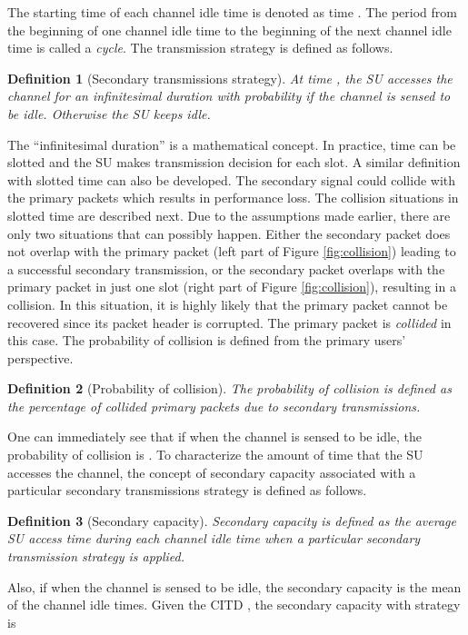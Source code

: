 \documentclass[10pt,final,journal,letterpaper]{IEEEtran}
\newtheorem{definition}{Definition}
\begin{document}
\par
The starting time of each channel idle time is denoted as time . The period from the beginning of one channel idle time to the beginning of the next channel idle time is called a \emph{cycle}. The transmission strategy is defined as follows.
\begin{definition}[Secondary transmissions strategy]
At time , the SU accesses the channel for an infinitesimal duration with probability  if the channel is sensed to be idle. Otherwise the SU keeps idle.
\end{definition}
The ``infinitesimal duration'' is a mathematical concept. In practice, time can be slotted and the SU makes transmission decision for each slot. A similar definition with slotted time can also be developed. The secondary signal could collide with the primary packets which results in performance loss. The collision situations in slotted time are described next. Due to the assumptions made earlier, there are only two situations that can possibly happen. Either the secondary packet does not overlap with the primary packet (left part of Figure \ref{fig:collision}) leading to a successful secondary transmission, or the secondary packet overlaps with the primary packet in just one slot (right part of Figure \ref{fig:collision}), resulting in a collision. In this situation, it is highly likely that the primary packet cannot be recovered since its packet header is corrupted. The primary packet is \emph{collided} in this case. The probability of collision is defined from the primary users' perspective.
\begin{definition}[Probability of collision]
The probability of collision is defined as the percentage of \emph{collided} primary packets due to secondary transmissions.
\end{definition}
One can immediately see that if   when the channel is sensed to be idle, the probability of collision is . To characterize the amount of time that the SU accesses the channel, the concept of secondary capacity associated with a particular secondary transmissions strategy is defined as follows.
\begin{definition}[Secondary capacity]
Secondary capacity is defined as the average SU access time during each channel idle time when a particular secondary transmission strategy is applied.
\end{definition}
Also, if   when the channel is sensed to be idle, the secondary capacity is the mean of the channel idle times. Given the CITD , the secondary capacity with strategy  is
\end{document}
